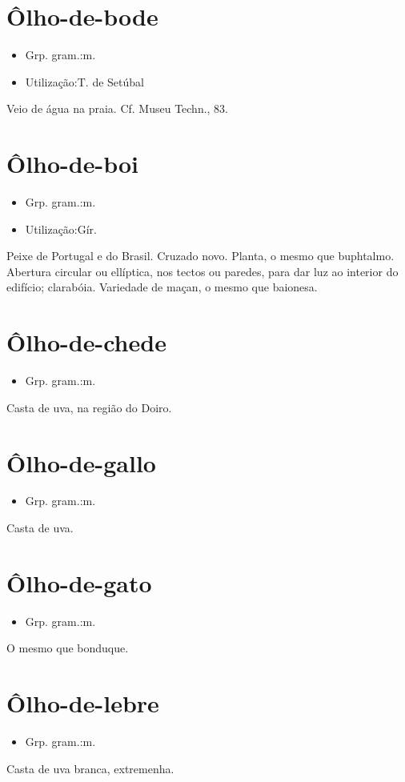 \section{Ôlho-de-bode}
\begin{itemize}
\item {Grp. gram.:m.}
\end{itemize}
\begin{itemize}
\item {Utilização:T. de Setúbal}
\end{itemize}
Veio de água na praia. Cf. \textunderscore Museu Techn.\textunderscore , 83.
\section{Ôlho-de-boi}
\begin{itemize}
\item {Grp. gram.:m.}
\end{itemize}
\begin{itemize}
\item {Utilização:Gír.}
\end{itemize}
Peixe de Portugal e do Brasil.
Cruzado novo.
Planta, o mesmo que \textunderscore buphtalmo\textunderscore .
Abertura circular ou ellíptica, nos tectos ou paredes, para dar luz ao interior do edifício; clarabóia.
Variedade de maçan, o mesmo que \textunderscore baionesa\textunderscore .
\section{Ôlho-de-chede}
\begin{itemize}
\item {Grp. gram.:m.}
\end{itemize}
Casta de uva, na região do Doiro.
\section{Ôlho-de-gallo}
\begin{itemize}
\item {Grp. gram.:m.}
\end{itemize}
Casta de uva.
\section{Ôlho-de-gato}
\begin{itemize}
\item {Grp. gram.:m.}
\end{itemize}
O mesmo que \textunderscore bonduque\textunderscore .
\section{Ôlho-de-lebre}
\begin{itemize}
\item {Grp. gram.:m.}
\end{itemize}
Casta de uva branca, extremenha.
